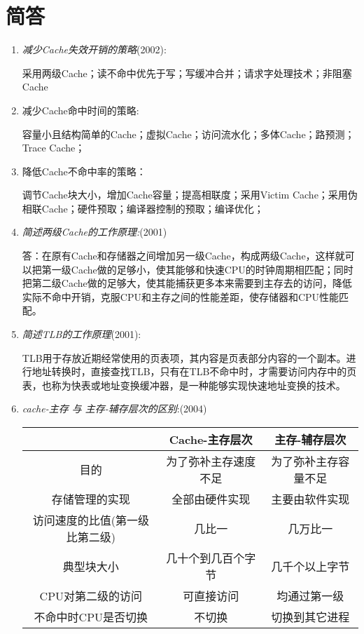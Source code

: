 \documentclass[a4paper]{ctexbook}
\begin{document}
\section{简答}
\begin{enumerate}
  
  \item \emph{减少Cache失效开销的策略}(2002):

  采用两级Cache；读不命中优先于写；写缓冲合并；请求字处理技术；非阻塞Cache
  \item 减少Cache命中时间的策略:
  
  容量小且结构简单的Cache；虚拟Cache；访问流水化；多体Cache；路预测；Trace Cache；
  \item 降低Cache不命中率的策略：
  
  调节Cache块大小，增加Cache容量；提高相联度；采用Victim Cache；采用伪相联Cache；硬件预取；编译器控制的预取；编译优化；
  \item {\color{grey}\emph{简述两级Cache的工作原理:}(2001)
  
  答：在原有Cache和存储器之间增加另一级Cache，构成两级Cache，这样就可以把第一级Cache做的足够小，使其能够和快速CPU的时钟周期相匹配；同时把第二级Cache做的足够大，使其能捕获更多本来需要到主存去的访问，降低实际不命中开销，克服CPU和主存之间的性能差距，使存储器和CPU性能匹配。}

  \item {\color{grey}\emph{简述TLB的工作原理}(2001):
  
  TLB用于存放近期经常使用的页表项，其内容是页表部分内容的一个副本。进行地址转换时，直接查找TLB，只有在TLB不命中时，才需要访问内存中的页表，也称为快表或地址变换缓冲器，是一种能够实现快速地址变换的技术。}
  
  \item {\color{grey}\emph{cache-主存 与 主存-辅存层次的区别}:(2004)}
  \begin{table}[H]
    \centering
    \textcolor{grey}{
    \begin{tabular}{c|c|c}
      \hline
      &Cache-主存层次&主存-辅存层次 \\
      \hline  
      目的&为了弥补主存速度不足&为了弥补主存容量不足\\
      \hline
      存储管理的实现&全部由硬件实现&主要由软件实现\\
      \hline
      访问速度的比值(第一级比第二级)&几比一&几万比一\\
      \hline
      典型块大小&几十个到几百个字节&几千个以上字节\\
      \hline
      CPU对第二级的访问&可直接访问&均通过第一级\\
      \hline
      不命中时CPU是否切换&不切换&切换到其它进程\\
      \hline
    \end{tabular}}
  \end{table}
\end{enumerate}
\end{document}
